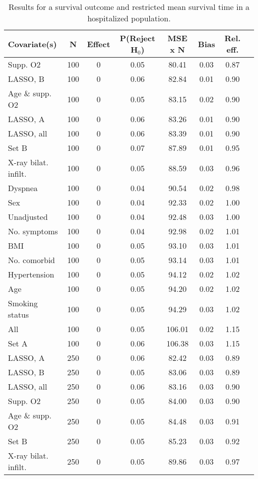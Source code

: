\documentclass{article}
\begin{document}
{\tabcolsep=6pt  %
\begin{longtable}{lccccccc}
\caption{Results for a survival outcome and restricted mean survival time in a hospitalized population.}\label{tab1}\\
Covariate(s) & N & Effect & P(Reject H$_0$) & MSE x N & Bias & Rel. eff.\\ \midrule
Supp. O2 & 100 & 0 & 0.05 & 80.41 & 0.03 & 0.87\\
LASSO, B & 100 & 0 & 0.06 & 82.84 & 0.01 & 0.90\\
Age \& supp. O2 & 100 & 0 & 0.05 & 83.15 & 0.02 & 0.90\\
LASSO, A & 100 & 0 & 0.06 & 83.26 & 0.01 & 0.90\\
LASSO, all & 100 & 0 & 0.06 & 83.39 & 0.01 & 0.90\\
Set B & 100 & 0 & 0.07 & 87.89 & 0.01 & 0.95\\
X-ray bilat. infilt. & 100 & 0 & 0.05 & 88.59 & 0.03 & 0.96\\
Dyspnea & 100 & 0 & 0.04 & 90.54 & 0.02 & 0.98\\
Sex & 100 & 0 & 0.04 & 92.33 & 0.02 & 1.00\\
Unadjusted & 100 & 0 & 0.04 & 92.48 & 0.03 & 1.00\\
No. symptoms & 100 & 0 & 0.04 & 92.98 & 0.02 & 1.01\\
BMI & 100 & 0 & 0.05 & 93.10 & 0.03 & 1.01\\
No. comorbid & 100 & 0 & 0.05 & 93.14 & 0.03 & 1.01\\
Hypertension & 100 & 0 & 0.05 & 94.12 & 0.02 & 1.02\\
Age & 100 & 0 & 0.05 & 94.20 & 0.02 & 1.02\\
Smoking status & 100 & 0 & 0.05 & 94.29 & 0.03 & 1.02\\
All & 100 & 0 & 0.05 & 106.01 & 0.02 & 1.15\\
Set A & 100 & 0 & 0.06 & 106.38 & 0.03 & 1.15\\ \midrule
LASSO, A & 250 & 0 & 0.06 & 82.42 & 0.03 & 0.89\\
LASSO, B & 250 & 0 & 0.05 & 83.06 & 0.03 & 0.89\\
LASSO, all & 250 & 0 & 0.06 & 83.16 & 0.03 & 0.90\\
Supp. O2 & 250 & 0 & 0.05 & 84.00 & 0.03 & 0.90\\
Age \& supp. O2 & 250 & 0 & 0.05 & 84.48 & 0.03 & 0.91\\
Set B & 250 & 0 & 0.05 & 85.23 & 0.03 & 0.92\\
X-ray bilat. infilt. & 250 & 0 & 0.05 & 89.86 & 0.03 & 0.97\\

\end{longtable}}
\end{document}
